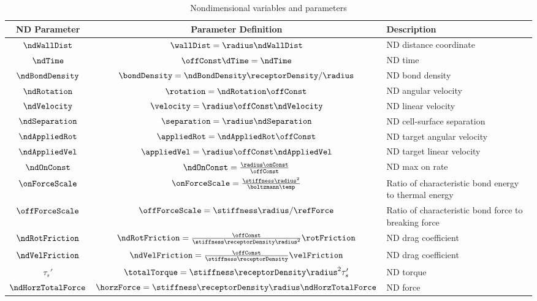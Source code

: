 \begin{table}
  \renewcommand{\arraystretch}{1.5}
  \centering
  \begin{tabu}{ccX}
    \toprule
    ND Parameter & Parameter Definition & Description \\
    \midrule $\ndWallDist$ & $\wallDist = \radius\ndWallDist$ & ND
    distance
    coordinate \\
    $\ndTime$ & $\offConst \dTime = \ndTime$ & ND time \\
    $\ndBondDensity$ & $\bondDensity = \ndBondDensity
    \receptorDensity/\radius$ & ND bond density \\
    $\ndRotation$ & $\rotation = \ndRotation \offConst$ & ND angular
    velocity \\
    $\ndVelocity$ & $\velocity = \radius \offConst \ndVelocity$ & ND
    linear velocity
    \\
    $\ndSeparation$ & $\separation = \radius \ndSeparation$ & ND
    cell-surface separation
    \\
    $\ndAppliedRot$ & $\appliedRot = \ndAppliedRot \offConst$ & ND
    target angular
    velocity \\
    $\ndAppliedVel$ & $\appliedVel = \radius \offConst \ndAppliedVel$
    & ND target linear velocity \\
    $\ndOnConst$ & $\ndOnConst = \frac{\radius \onConst}{\offConst}$
    & ND max on rate \\
    $\onForceScale$ &
    $\onForceScale = \frac{\stiffness \radius^2}{\boltzmann \temp}$ &
    Ratio of characteristic bond energy to
    thermal energy \\
    $\offForceScale$ & $\offForceScale = \stiffness \radius/\refForce$
    & Ratio of characteristic bond
    force to breaking force\\
    $\ndRotFriction$ &
    $\ndRotFriction = \frac{\offConst}{\stiffness \receptorDensity
      \radius^2} \rotFriction$ & ND drag coefficient
    \\
    $\ndVelFriction$ &
    $\ndVelFriction = \frac{\offConst}{\stiffness \receptorDensity}
    \velFriction$ & ND drag coefficient
    \\
    $\tau_s'$ & $\totalTorque = \stiffness \receptorDensity \radius^2
    \tau_s'$ & ND torque \\
    $\ndHorzTotalForce$ & $\horzForce = \stiffness \receptorDensity
    \radius \ndHorzTotalForce$ & ND force \\
    \bottomrule
  \end{tabu}
  \caption{Nondimensional variables and parameters}
  \label{tab:nd-vars}
\end{table}

